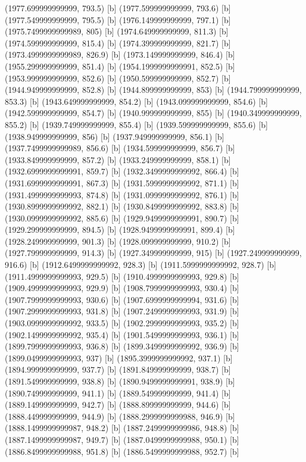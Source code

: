 {{{(1977.699999999999, 793.5) [b] 
(1977.599999999999, 793.6) [b] 
(1977.549999999999, 795.5) [b] 
(1976.149999999999, 797.1) [b] 
(1975.7499999999989, 805) [b] 
(1974.649999999999, 811.3) [b] 
(1974.599999999999, 815.4) [b] 
(1974.399999999999, 821.7) [b] 
(1973.4999999999989, 826.9) [b] 
(1973.149999999999, 846.4) [b] 
(1955.299999999999, 851.4) [b] 
(1954.1999999999991, 852.5) [b] 
(1953.999999999999, 852.6) [b] 
(1950.599999999999, 852.7) [b] 
(1944.949999999999, 852.8) [b] 
(1944.899999999999, 853) [b] 
(1944.799999999999, 853.3) [b] 
(1943.649999999999, 854.2) [b] 
(1943.099999999999, 854.6) [b] 
(1942.599999999999, 854.7) [b] 
(1940.999999999999, 855) [b] 
(1940.349999999999, 855.2) [b] 
(1939.749999999999, 855.4) [b] 
(1939.599999999999, 855.6) [b] 
(1938.949999999999, 856) [b] 
(1937.949999999999, 856.1) [b] 
(1937.7499999999989, 856.6) [b] 
(1934.599999999999, 856.7) [b] 
(1933.849999999999, 857.2) [b] 
(1933.249999999999, 858.1) [b] 
(1932.6999999999991, 859.7) [b] 
(1932.3499999999992, 866.4) [b] 
(1931.6999999999991, 867.3) [b] 
(1931.5999999999992, 871.1) [b] 
(1931.4999999999993, 874.8) [b] 
(1931.0999999999992, 876.1) [b] 
(1930.8999999999992, 882.1) [b] 
(1930.8499999999992, 883.8) [b] 
(1930.0999999999992, 885.6) [b] 
(1929.9499999999991, 890.7) [b] 
(1929.299999999999, 894.5) [b] 
(1928.9499999999991, 899.4) [b] 
(1928.249999999999, 901.3) [b] 
(1928.099999999999, 910.2) [b] 
(1927.799999999999, 914.3) [b] 
(1927.349999999999, 915) [b] 
(1927.249999999999, 916.6) [b] 
(1912.6499999999992, 928.3) [b] 
(1911.5999999999992, 928.7) [b] 
(1911.4999999999993, 929.5) [b] 
(1910.4999999999993, 929.8) [b] 
(1909.4999999999993, 929.9) [b] 
(1908.7999999999993, 930.4) [b] 
(1907.7999999999993, 930.6) [b] 
(1907.6999999999994, 931.6) [b] 
(1907.2999999999993, 931.8) [b] 
(1907.2499999999993, 931.9) [b] 
(1903.0999999999992, 933.5) [b] 
(1902.2999999999993, 935.2) [b] 
(1902.1499999999992, 935.4) [b] 
(1901.5499999999993, 936.1) [b] 
(1899.7999999999993, 936.8) [b] 
(1899.3499999999992, 936.9) [b] 
(1899.0499999999993, 937) [b] 
(1895.3999999999992, 937.1) [b] 
(1894.999999999999, 937.7) [b] 
(1891.849999999999, 938.7) [b] 
(1891.549999999999, 938.8) [b] 
(1890.9499999999991, 938.9) [b] 
(1890.749999999999, 941.1) [b] 
(1889.549999999999, 941.4) [b] 
(1889.149999999999, 942.7) [b] 
(1888.899999999999, 944.6) [b] 
(1888.449999999999, 944.9) [b] 
(1888.2999999999988, 946.9) [b] 
(1888.1499999999987, 948.2) [b] 
(1887.2499999999986, 948.8) [b] 
(1887.1499999999987, 949.7) [b] 
(1887.0499999999988, 950.1) [b] 
(1886.8499999999988, 951.8) [b] 
(1886.5499999999988, 952.7) [b] 
}}}
